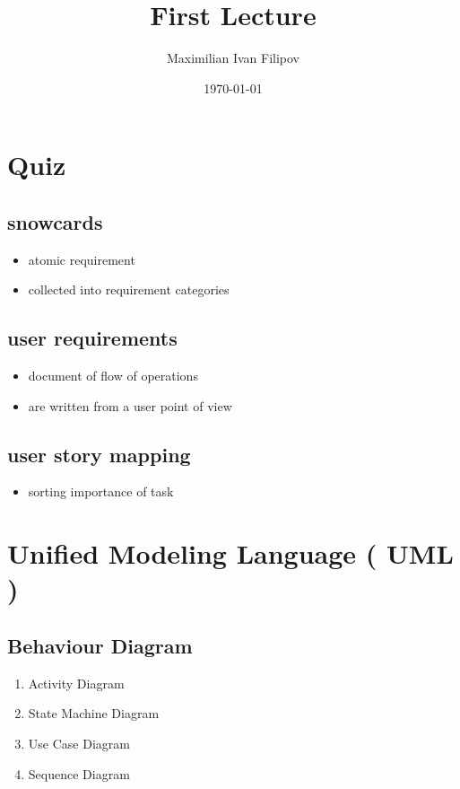 \documentclass[11pt]{article}
\author{Maximilian Ivan Filipov}
\date{\today}
\title{First Lecture}
\begin{document}
\maketitle
\tableofcontents

\pagebreak
\section{Quiz}
\label{sec:org25c7afb}
\vspace*{0.5cm}
\subsection{snowcards}
\label{sec:org5bd24d5}
\begin{itemize}
\item atomic requirement
\item collected into requirement categories
\end{itemize}
\subsection{user requirements}
\label{sec:orga3803a6}
\begin{itemize}
\item document of flow of operations
\item are written from a user point of view
\end{itemize}
\subsection{user story mapping}
\label{sec:orgc83af14}
\begin{itemize}
\item sorting importance of task
\end{itemize}
\pagebreak
\vspace*{-4cm}
\section{Unified Modeling Language ( UML )}
\label{sec:org37287d6}
\subsection{Behaviour Diagram}
\label{sec:orge5854cc}
\begin{enumerate}
\item Activity Diagram
\label{sec:org0407e35}
\item State Machine Diagram
\label{sec:org2d61c22}
\item Use Case Diagram
\label{sec:org175ba39}
\item Sequence Diagram
\label{sec:orgc9e4e88}
\end{enumerate}
\end{document}
